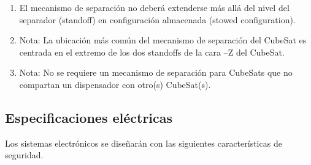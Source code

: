 \documentclass[11pt,a4paper,twoside]{report}
\begin{document}
\begin{enumerate}
		\item El mecanismo de separación no deberá extenderse más allá del nivel del separador (standoff) en configuración almacenada (stowed configuration).
		
		\item Nota: La ubicación más común del mecanismo de separación del CubeSat es centrada en el extremo de los dos standoffs de la cara –Z del CubeSat.
		
		\item Nota: No se requiere un mecanismo de separación para CubeSats que no compartan un dispensador con otro(s) CubeSat(s).
	\end{enumerate}
	
	
	
	\subsection{Especificaciones eléctricas}
	Los sistemas electrónicos se diseñarán con las siguientes características de seguridad.
\end{document}
